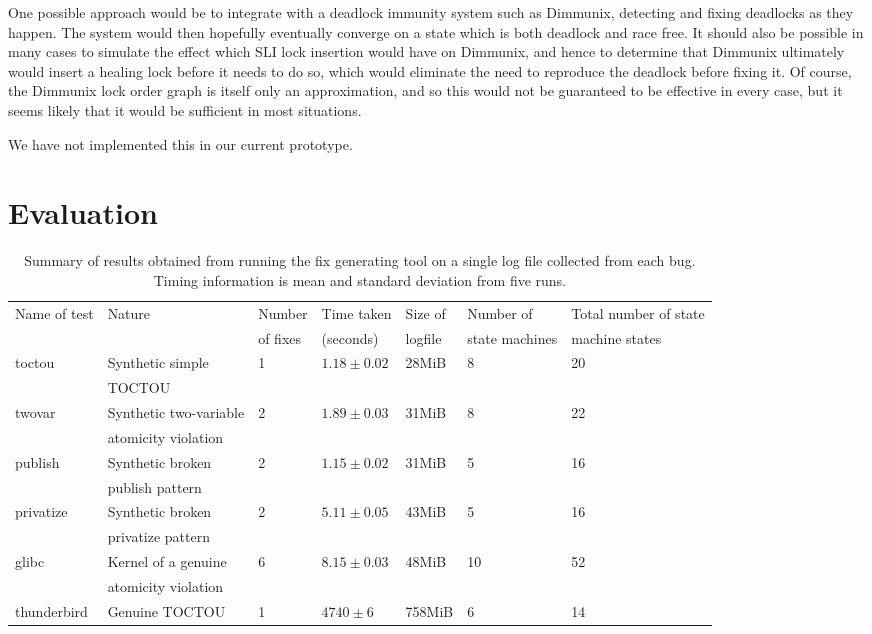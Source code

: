 \documentclass[10pt,twocolumn,preprint,natbib,authoryear]{sigplanconf}
\begin{document}
One possible approach would be to integrate with a deadlock immunity
system such as Dimmunix\cite{Jula2008}, detecting and fixing deadlocks
as they happen.  The system would then hopefully eventually converge
on a state which is both deadlock and race free.  It should also be
possible in many cases to simulate the effect which SLI lock insertion
would have on Dimmunix, and hence to determine that Dimmunix
ultimately would insert a healing lock before it needs to do so, which
would eliminate the need to reproduce the deadlock before fixing it.
Of course, the Dimmunix lock order graph is itself only an
approximation, and so this would not be guaranteed to be effective in
every case, but it seems likely that it would be sufficient in most
situations.

We have not implemented this in our current prototype.

\section{Evaluation}

\begin{table*}
\begin{tabular}{lllllll}
Name of test & Nature & Number & Time taken & Size of & Number of & Total number of state\\
 & & of fixes & (seconds) & logfile & state machines & machine states\\
\hline
toctou & Synthetic simple & 1 & $1.18 \pm 0.02$ & 28MiB & 8 & 20\\
       & TOCTOU & & & \\
twovar & Synthetic two-variable & 2 & $1.89 \pm 0.03$ & 31MiB & 8 & 22\\
       & atomicity violation &&&\\
publish & Synthetic broken & 2 & $1.15 \pm 0.02$ & 31MiB & 5 & 16 \\
        & publish pattern & & & \\
privatize & Synthetic broken & 2 & $5.11 \pm 0.05$ & 43MiB & 5 & 16 \\
          & privatize pattern & & & \\
\hline
glibc & Kernel of a genuine & 6 & $8.15 \pm 0.03$ & 48MiB & 10 & 52\\
      & atomicity violation & & & \\
\hline
thunderbird & Genuine TOCTOU & 1 & $4740 \pm 6$ & 758MiB & 6 & 14
\end{tabular}
\caption{Summary of results obtained from running the fix generating
  tool on a single log file collected from each bug.  Timing
  information is mean and standard deviation from five runs.}
\label{tab:perf_summary}
\end{table*}
\end{document}
